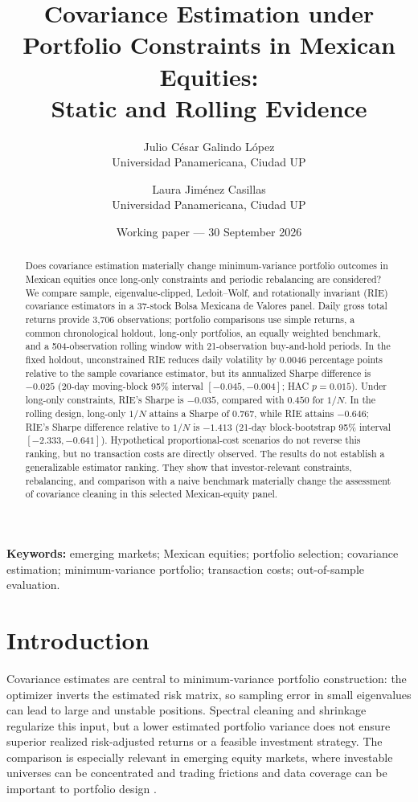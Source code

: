 \documentclass[11pt]{article}
\title{Covariance Estimation under Portfolio Constraints in Mexican Equities:\\
Static and Rolling Evidence}
\author{Julio C\'esar Galindo L\'opez\\
\small Universidad Panamericana, Ciudad UP
\and
Laura Jim\'enez Casillas\\
\small Universidad Panamericana, Ciudad UP}
\date{Working paper --- 30 September 2026}
\begin{document}
\maketitle

\begin{abstract}
Does covariance estimation materially change minimum-variance portfolio
outcomes in Mexican equities once long-only constraints and periodic
rebalancing are considered? We compare sample, eigenvalue-clipped,
Ledoit--Wolf, and rotationally invariant (RIE) covariance estimators in a
37-stock Bolsa Mexicana de Valores panel. Daily gross total returns provide
3,706 observations; portfolio comparisons use simple returns, a common
chronological holdout, long-only portfolios, an equally weighted benchmark,
and a 504-observation rolling window with 21-observation buy-and-hold periods.
In the fixed holdout, unconstrained RIE reduces daily volatility by 0.0046
percentage points relative to the sample covariance estimator, but its
annualized Sharpe difference is $-0.025$ (20-day moving-block 95\% interval
$[-0.045,-0.004]$; HAC $p=0.015$). Under long-only constraints, RIE's Sharpe
is $-0.035$, compared with $0.450$ for $1/N$. In the rolling design,
long-only $1/N$ attains a Sharpe of $0.767$, while RIE attains $-0.646$;
RIE's Sharpe difference relative to $1/N$ is $-1.413$ (21-day block-bootstrap
95\% interval $[-2.333,-0.641]$). Hypothetical proportional-cost scenarios
do not reverse this ranking, but no transaction costs are directly observed.
The results do not establish a generalizable estimator ranking. They show
that investor-relevant constraints, rebalancing, and comparison with a naive
benchmark materially change the assessment of covariance cleaning in this
selected Mexican-equity panel.
\end{abstract}

\noindent\textbf{Keywords:} emerging markets; Mexican equities; portfolio
selection; covariance estimation; minimum-variance portfolio; transaction
costs; out-of-sample evaluation.

\section{Introduction}

Covariance estimates are central to minimum-variance portfolio construction:
the optimizer inverts the estimated risk matrix, so sampling error in small
eigenvalues can lead to large and unstable positions. Spectral cleaning and
shrinkage regularize this input, but a lower estimated portfolio variance
does not ensure superior realized risk-adjusted returns or a feasible
investment strategy. The comparison is especially relevant in emerging
equity markets, where investable universes can be concentrated and trading
frictions and data coverage can be important to portfolio design
\cite{bekaert2007}.
\end{document}
